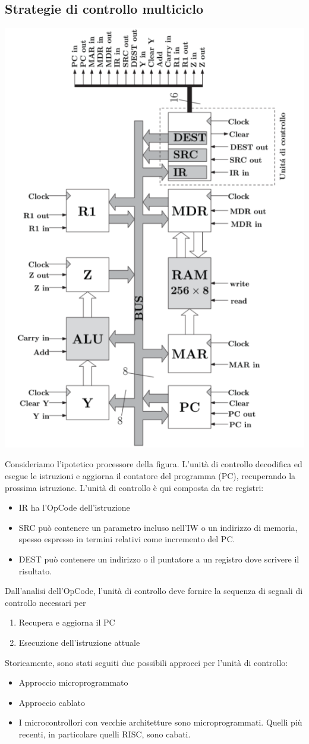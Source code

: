 \documentclass[12pt,a4paper]{article}
\begin{document}
\subsection{Strategie di controllo multiciclo}
\begin{center}
\includegraphics[width=0.5\columnwidth]{img/multiciclo.png}
\end{center}
Consideriamo l'ipotetico processore della figura. L'unità di controllo decodifica ed esegue le istruzioni e aggiorna il contatore del programma (PC), recuperando la prossima istruzione. L'unità di controllo è qui composta da tre registri:
\begin{itemize}
\item IR ha l'OpCode dell'istruzione
\item SRC può contenere un parametro incluso nell'IW o un indirizzo di memoria, spesso espresso in termini relativi come incremento del PC.
\item DEST può contenere un indirizzo o il puntatore a un registro dove scrivere il risultato.
\end{itemize}
Dall'analisi dell'OpCode, l'unità di controllo deve fornire la sequenza di segnali di controllo necessari per
\begin{enumerate}
\item Recupera e aggiorna il PC
\item Esecuzione dell'istruzione attuale
\end{enumerate}
Storicamente, sono stati seguiti due possibili approcci per l'unità di controllo:
\begin{itemize}
\item Approccio microprogrammato
\item Approccio cablato
\item I microcontrollori con vecchie architetture sono microprogrammati. Quelli più recenti, in particolare quelli RISC, sono cabati.
\end{itemize}
\end{document}
